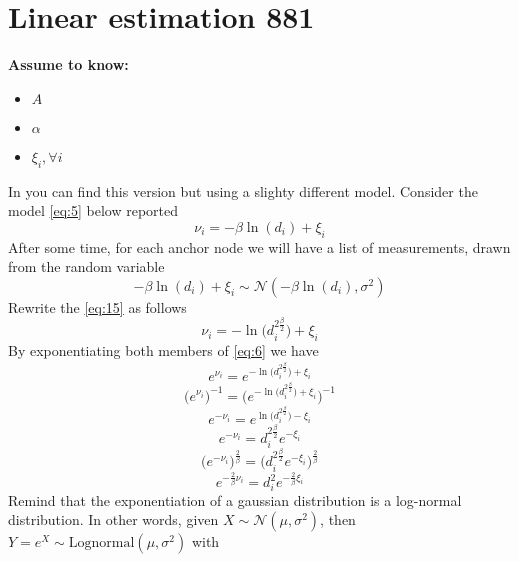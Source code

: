 \documentclass[12pt,twoside]{report}
\begin{document}
\section{Linear estimation 881}
  \begin{center}
  \textbf{Assume to know:}
  \begin{itemize}
    \centering
    \item $A$
    \item $\alpha$
    \item $\xi_i,\forall i$
  \end{itemize}
  \end{center}
In \cite{rzk} you can find this version but using a slighty different model.
Consider the model \ref{eq:5} below reported
\begin{equation}
    \nu_i=-\beta\ln(d_i)+\xi_i
    \label{eq:15}
\end{equation}
After some time, for each anchor node we will have a list of measurements, drawn from the random variable 
\begin{equation}
-\beta\ln(d_i)+\xi_i\sim \mathcal{N}(-\beta\ln(d_i),\sigma^2)
\label{eq:14}
\end{equation}
Rewrite the \ref{eq:15} as follows 
\begin{equation}
    \nu_i=-\ln\big(d_i^{2\frac{\beta}{2}}\big)+\xi_i
    \label{eq:6}
\end{equation}
By exponentiating both members of \ref{eq:6} we have 
\begin{equation}
    e^{\nu_i}=e^{-\ln\big(d_i^{2\frac{\beta}{2}}\big)+\xi_i}
\end{equation}
\begin{equation}
    \bigg(e^{\nu_i}\bigg)^{-1}=\bigg(e^{-\ln\big(d_i^{2\frac{\beta}{2}}\big)+\xi_i}\bigg)^{-1}
\end{equation}
\begin{equation}
    e^{-\nu_i}=e^{\ln\big(d_i^{2\frac{\beta}{2}}\big)-\xi_i}
\end{equation}
\begin{equation}
    e^{-\nu_i}=d_i^{2\frac{\beta}{2}}e^{-\xi_i}
\end{equation}
\begin{equation}
    \bigg(e^{-\nu_i}\bigg)^{\frac{2}{\beta}}=\bigg(d_i^{2\frac{\beta}{2}}e^{-\xi_i}\bigg)^{\frac{2}{\beta}}
\end{equation}
\begin{equation}
    e^{-\frac{2}{\beta}\nu_i}=d_i^2e^{-\frac{2}{\beta}\xi_i}
\end{equation}
Remind that the exponentiation of a gaussian distribution is \cite{Beran2011} a log-normal distribution. In other words, given $X\sim \mathcal{N}(\mu,\sigma^2)$, then $Y=e^X\sim \text{Lognormal}(\mu,\sigma^2)$ with
\end{document}

